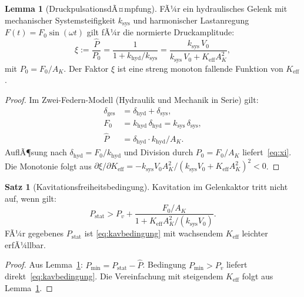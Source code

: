 ﻿\documentclass[a4paper,12pt]{scrreprt}
\theoremstyle{definition}
\newtheorem{satz}{Satz}[section]
\newtheorem{lemma}{Lemma}[section]
\begin{document}
\begin{lemma}[DruckpulsationsdÃ¤mpfung]
\label{lem:druckpuls}
FÃ¼r ein hydraulisches Gelenk mit mechanischer Systemsteifigkeit $k_{\text{sys}}$
und harmonischer Lastanregung $F(t) = F_0 \sin(\omega t)$ gilt fÃ¼r die
normierte Druckamplitude:
\begin{equation}
  \xi := \frac{\hat{P}}{P_0}
  = \frac{1}{1 + k_{\text{hyd}}/k_{\text{sys}}}
  = \frac{k_{\text{sys}} \, V_0}{k_{\text{sys}} \, V_0 + K_{\text{eff}} A_K^2},
  \label{eq:xi}
\end{equation}
mit $P_0 = F_0/A_K$. Der Faktor $\xi$ ist eine streng monoton fallende
Funktion von $K_{\text{eff}}$.
\end{lemma}

\begin{proof}
Im Zwei-Federn-Modell (Hydraulik und Mechanik in Serie) gilt:
\begin{align*}
  \delta_{\text{ges}} &= \delta_{\text{hyd}} + \delta_{\text{sys}},\\
  F_0 &= k_{\text{hyd}} \, \delta_{\text{hyd}} = k_{\text{sys}} \, \delta_{\text{sys}},\\
  \hat{P} &= \delta_{\text{hyd}} \cdot k_{\text{hyd}} / A_K.
\end{align*}
AuflÃ¶sung nach $\delta_{\text{hyd}} = F_0/k_{\text{hyd}}$ und Division durch
$P_0 = F_0/A_K$ liefert~\eqref{eq:xi}. Die Monotonie folgt aus
$\partial \xi / \partial K_{\text{eff}} = -k_{\text{sys}} V_0 A_K^2 /
(k_{\text{sys}} V_0 + K_{\text{eff}} A_K^2)^2 < 0$.
\end{proof}

\begin{satz}[Kavitationsfreiheitsbedingung]
\label{satz:kavitation}
Kavitation im Gelenkaktor tritt nicht auf, wenn gilt:
\begin{equation}
  P_{\text{stat}} > P_v + \frac{F_0/A_K}{1 + K_{\text{eff}} A_K^2/(k_{\text{sys}} V_0)}.
  \label{eq:kavbedingung}
\end{equation}
FÃ¼r gegebenes $P_{\text{stat}}$ ist \eqref{eq:kavbedingung} mit
wachsendem $K_{\text{eff}}$ leichter erfÃ¼llbar.
\end{satz}

\begin{proof}
Aus Lemma~\ref{lem:druckpuls}: $P_{\min} = P_{\text{stat}} - \hat{P}$.
Bedingung $P_{\min} > P_v$ liefert direkt~\eqref{eq:kavbedingung}.
Die Vereinfachung mit steigendem $K_{\text{eff}}$ folgt aus
Lemma~\ref{lem:druckpuls}.
\end{proof}
\end{document}
